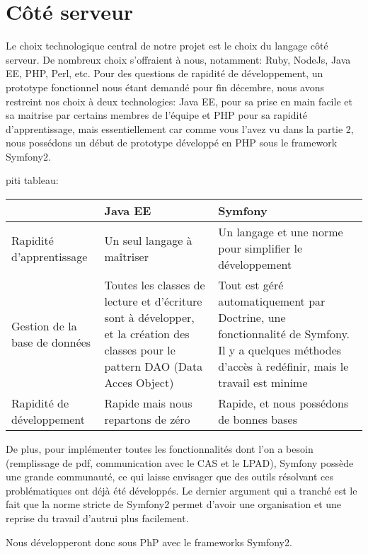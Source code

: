\section{Côté serveur}
Le choix technologique central de notre projet est le choix du langage côté serveur. De nombreux choix s'offraient à nous, notamment: Ruby, NodeJs, Java EE, PHP, Perl, etc.
Pour des questions de rapidité de développement, un prototype fonctionnel nous étant demandé pour fin décembre, nous avons restreint nos choix à deux technologies: Java EE, pour sa prise en main facile et sa maitrise par certains membres de l'équipe et PHP pour sa rapidité d'apprentissage, mais essentiellement car comme vous l'avez vu dans la partie 2, nous possédons un début de prototype développé en PHP sous le framework Symfony2.

piti tableau:

\begin{tabular}{|m{125pt}|m{150pt}|m{150pt}|}
	\hline
	\null & \textbf{Java EE} & \textbf{Symfony} \\
	\hline
	Rapidité d'apprentissage & Un  seul langage à maîtriser & Un langage et une norme pour simplifier le développement\\
	\hline
	Gestion de la base de données & Toutes les classes de lecture et d'écriture sont à développer, et la création des classes pour le pattern DAO (Data Acces Object) & Tout est géré automatiquement par Doctrine, une fonctionnalité de Symfony. Il y a quelques méthodes d'accès à redéfinir, mais le travail est minime\\
	\hline
	Rapidité de développement & Rapide mais nous repartons de zéro & Rapide, et nous possédons de bonnes bases\\
	\hline
\end{tabular}
%                       
% 
%
%
%
%  
%
%

De plus, pour implémenter toutes les fonctionnalités dont l'on a besoin (remplissage de pdf, communication avec le CAS et le LPAD), Symfony possède une grande communauté, ce qui laisse envisager que des outils résolvant ces problématiques ont déjà été développés.
Le dernier argument qui a tranché est le fait que la norme stricte de Symfony2 permet d'avoir une organisation et une reprise du travail d'autrui plus facilement.

Nous développeront donc sous PhP avec le frameworks Symfony2.